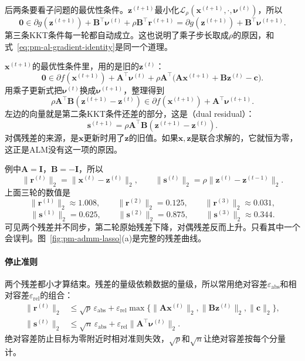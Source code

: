 后两条要看子问题的最优性条件。$\bm{z}^{(t+1)}$最小化$\mathcal{L}_\rho(\bm{x}^{(t+1)},\cdot,\bm{\nu}^{(t)})$，所以
\[
 \bm{0}\in\partial g(\bm{z}^{(t+1)})+\bm{B}^\top\bm{\nu}^{(t)}+\rho\bm{B}^\top\bm{r}^{(t+1)}=\partial g(\bm{z}^{(t+1)})+\bm{B}^\top\bm{\nu}^{(t+1)}.
\]
第三条KKT条件每一轮都自动成立。这也说明了乘子步长取成$\rho$的原因，和式~\eqref{eq:pm-al-gradient-identity}是同一个道理。

$\bm{x}^{(t+1)}$的最优性条件里，用的是旧的$\bm{z}^{(t)}$：
\[
 \bm{0}\in\partial f(\bm{x}^{(t+1)})+\bm{A}^\top\bm{\nu}^{(t)}+\rho\bm{A}^\top\bigl(\bm{A}\bm{x}^{(t+1)}+\bm{B}\bm{z}^{(t)}-\bm{c}\bigr).
\]
用乘子更新式把$\bm{\nu}^{(t)}$换成$\bm{\nu}^{(t+1)}$，整理得到
\begin{equation}
 \rho\bm{A}^\top\bm{B}(\bm{z}^{(t+1)}-\bm{z}^{(t)})\in\partial f(\bm{x}^{(t+1)})+\bm{A}^\top\bm{\nu}^{(t+1)}.
 \label{eq:pm-admm-x-optimality}
\end{equation}
左边的向量就是第二条KKT条件还差的部分，这是（dual residual）：
\begin{equation}
 \bm{s}^{(t+1)}=\rho\bm{A}^\top\bm{B}(\bm{z}^{(t+1)}-\bm{z}^{(t)}).
 \label{eq:pm-admm-dual-residual}
\end{equation}
对偶残差的来源，是$\bm{x}$更新时用了$\bm{z}$的旧值。如果$\bm{x},\bm{z}$是联合求解的，它就恒为零，这正是ALM没有这一项的原因。

例中$\bm{A}=\bm{I}$，$\bm{B}=-\bm{I}$，所以
\[
 \lVert\bm{r}^{(t)}\rVert_2=\lVert\bm{x}^{(t)}-\bm{z}^{(t)}\rVert_2,\qquad
 \lVert\bm{s}^{(t)}\rVert_2=\rho\lVert\bm{z}^{(t)}-\bm{z}^{(t-1)}\rVert_2 .
\]
上面三轮的数值是
\[
 \lVert\bm{r}^{(1)}\rVert_2\approx1.008,\qquad\lVert\bm{r}^{(2)}\rVert_2=0.125,\qquad\lVert\bm{r}^{(3)}\rVert_2\approx0.031,
\]
\[
 \lVert\bm{s}^{(1)}\rVert_2=0.625,\qquad\lVert\bm{s}^{(2)}\rVert_2=0.875,\qquad\lVert\bm{s}^{(3)}\rVert_2\approx0.344 .
\]
可见两个残差并不同步，第二轮原始残差下降，对偶残差反而上升。只看其中一个会误判。图~\ref{fig:pm-admm-lasso}(a)是完整的残差曲线。

\paragraph{停止准则}
两个残差都小才算结束。残差的量级依赖数据的量级，所以常用绝对容差$\varepsilon_{\mathrm{abs}}$和相对容差$\varepsilon_{\mathrm{rel}}$的组合：
\begin{equation}
 \begin{aligned}
 \lVert\bm{r}^{(t)}\rVert_2&\leq\sqrt{p}\,\varepsilon_{\mathrm{abs}}+\varepsilon_{\mathrm{rel}}\max\bigl\{\lVert\bm{A}\bm{x}^{(t)}\rVert_2,\lVert\bm{B}\bm{z}^{(t)}\rVert_2,\lVert\bm{c}\rVert_2\bigr\},\\
 \lVert\bm{s}^{(t)}\rVert_2&\leq\sqrt{n}\,\varepsilon_{\mathrm{abs}}+\varepsilon_{\mathrm{rel}}\lVert\bm{A}^\top\bm{\nu}^{(t)}\rVert_2 .
 \end{aligned}
 \label{eq:pm-admm-stopping}
\end{equation}
绝对容差防止目标为零附近时相对准则失效，$\sqrt{p}$和$\sqrt{n}$让绝对容差按每个分量计。

